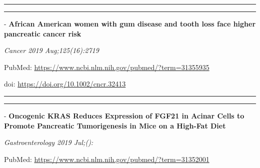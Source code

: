 \documentclass[]{article}
\begin{document}
{}

{}

\begin{center}\rule{0.5\linewidth}{\linethickness}\end{center}

\begin{center}\rule{0.5\linewidth}{\linethickness}\end{center}

 - \textbf{African American women with gum disease and tooth loss face
higher pancreatic cancer risk}

\emph{Cancer 2019 Aug;125(16):2719}

PubMed: \url{https://www.ncbi.nlm.nih.gov/pubmed/?term=31355935}

doi: \url{https://doi.org/10.1002/cncr.32413}

{}

{}

\begin{center}\rule{0.5\linewidth}{\linethickness}\end{center}

\begin{center}\rule{0.5\linewidth}{\linethickness}\end{center}

 - \textbf{Oncogenic KRAS Reduces Expression of FGF21 in Acinar Cells to
Promote Pancreatic Tumorigenesis in Mice on a High-Fat Diet}

\emph{Gastroenterology 2019 Jul;():}

PubMed: \url{https://www.ncbi.nlm.nih.gov/pubmed/?term=31352001}
\end{document}
